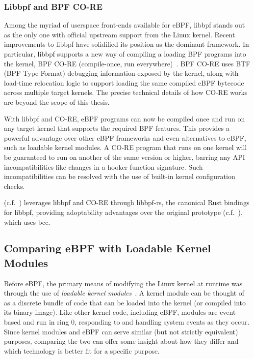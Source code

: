 \subsubsection*{Libbpf and BPF CO-RE}%

Among the myriad of userspace front-ends available for eBPF, libbpf stands out as the only
one with official upstream support from the Linux kernel. Recent improvements to libbpf
have solidified its position as the dominant framework. In particular, libbpf supports
a new way of compiling a loading BPF programs into the kernel, BPF CO-RE (compile-once,
run everywhere)~\cite{gregg2020_core, nakryiko2020_core}. BPF CO-RE uses BTF (BPF Type Format) debugging information
exposed by the kernel, along with load-time relocation logic to support loading the same
compiled eBPF bytecode across multiple target kernels. The precise technical details of how
CO-RE works are beyond the scope of this thesis.

With libbpf and CO-RE, eBPF programs can now be compiled once and run on any target kernel
that supports the required BPF features. This provides a powerful advantage over other
eBPF frameworks and even alternatives to eBPF, such as loadable kernel modules. A CO-RE
program that runs on one kernel will be guaranteed to run on another of the same version
or higher, barring any API incompatibilities like changes in a hooker function signature.
Such incompatibilities can be resolved with the use of built-in kernel configuration
checks.

\bpfcontain{} (c.f.~) leverages libbpf and CO-RE through libbpf-rs, the
canonical Rust bindings for libbpf, providing adoptability advantages over the original
\bpfbox{} prototype (c.f.~), which uses bcc.

\subsection{Comparing eBPF with Loadable Kernel Modules}%
\label{ss:bpf-vs-modules}

Before eBPF, the primary means of modifying the Linux kernel at runtime was through the
use of \textit{loadable kernel modules}~\cite{corbet1998_device_drivers}. A kernel module
can be thought of as a discrete bundle of code that can be loaded into the kernel (or
compiled into its binary image). Like other kernel code, including eBPF, modules are
event-based and run in ring 0, responding to and handling system events as they occur.
Since kernel modules and eBPF can serve similar (but not strictly equivalent) purposes,
comparing the two can offer some insight about how they differ and which technology is
better fit for a specific purpose.

